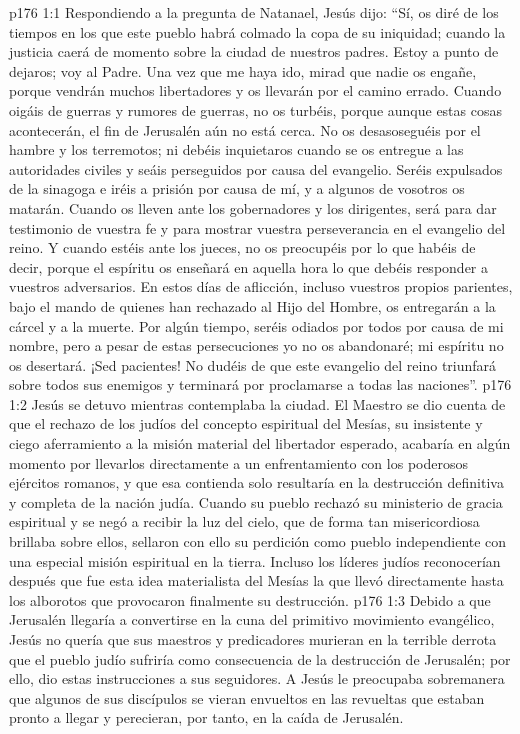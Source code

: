 \vs p176 1:1 Respondiendo a la pregunta de Natanael, Jesús dijo: “Sí, os diré de los tiempos en los que este pueblo habrá colmado la copa de su iniquidad; cuando la justicia caerá de momento sobre la ciudad de nuestros padres. Estoy a punto de dejaros; voy al Padre. Una vez que me haya ido, mirad que nadie os engañe, porque vendrán muchos libertadores y os llevarán por el camino errado. Cuando oigáis de guerras y rumores de guerras, no os turbéis, porque aunque estas cosas acontecerán, el fin de Jerusalén aún no está cerca. No os desasoseguéis por el hambre y los terremotos; ni debéis inquietaros cuando se os entregue a las autoridades civiles y seáis perseguidos por causa del evangelio. Seréis expulsados de la sinagoga e iréis a prisión por causa de mí, y a algunos de vosotros os matarán. Cuando os lleven ante los gobernadores y los dirigentes, será para dar testimonio de vuestra fe y para mostrar vuestra perseverancia en el evangelio del reino. Y cuando estéis ante los jueces, no os preocupéis por lo que habéis de decir, porque el espíritu os enseñará en aquella hora lo que debéis responder a vuestros adversarios. En estos días de aflicción, incluso vuestros propios parientes, bajo el mando de quienes han rechazado al Hijo del Hombre, os entregarán a la cárcel y a la muerte. Por algún tiempo, seréis odiados por todos por causa de mi nombre, pero a pesar de estas persecuciones yo no os abandonaré; mi espíritu no os desertará. ¡Sed pacientes! No dudéis de que este evangelio del reino triunfará sobre todos sus enemigos y terminará por proclamarse a todas las naciones”.
\vs p176 1:2 Jesús se detuvo mientras contemplaba la ciudad. El Maestro se dio cuenta de que el rechazo de los judíos del concepto espiritual del Mesías, su insistente y ciego aferramiento a la misión material del libertador esperado, acabaría en algún momento por llevarlos directamente a un enfrentamiento con los poderosos ejércitos romanos, y que esa contienda solo resultaría en la destrucción definitiva y completa de la nación judía. Cuando su pueblo rechazó su ministerio de gracia espiritual y se negó a recibir la luz del cielo, que de forma tan misericordiosa brillaba sobre ellos, sellaron con ello su perdición como pueblo independiente con una especial misión espiritual en la tierra. Incluso los líderes judíos reconocerían después que fue esta idea materialista del Mesías la que llevó directamente hasta los alborotos que provocaron finalmente su destrucción.
\vs p176 1:3 Debido a que Jerusalén llegaría a convertirse en la cuna del primitivo movimiento evangélico, Jesús no quería que sus maestros y predicadores murieran en la terrible derrota que el pueblo judío sufriría como consecuencia de la destrucción de Jerusalén; por ello, dio estas instrucciones a sus seguidores. A Jesús le preocupaba sobremanera que algunos de sus discípulos se vieran envueltos en las revueltas que estaban pronto a llegar y perecieran, por tanto, en la caída de Jerusalén.

